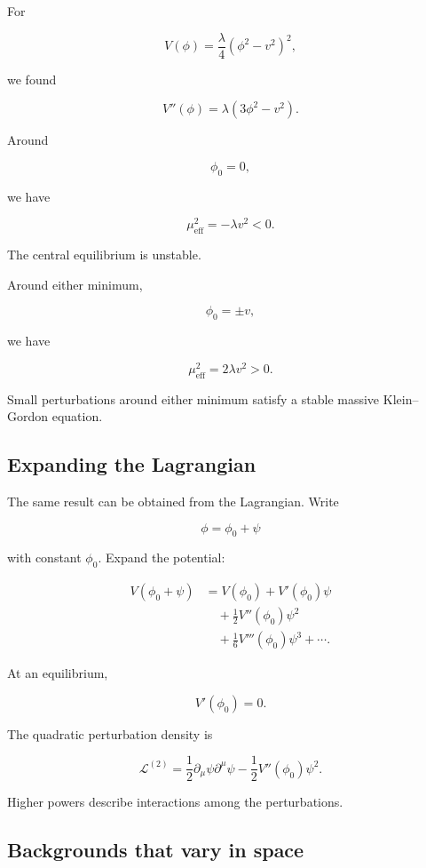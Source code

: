 For

\[
V(\phi)
=
\frac{\lambda}{4}
(\phi^{2}-v^{2})^{2},
\]

we found

\[
V''(\phi)
=
\lambda(3\phi^{2}-v^{2}).
\]

Around

\[
\phi_{0}=0,
\]

we have

\[
\boxed{
\mu_{\mathrm{eff}}^{2}
=
-\lambda v^{2}<0
}.
\]

The central equilibrium is unstable.

Around either minimum,

\[
\phi_{0}=\pm v,
\]

we have

\[
\boxed{
\mu_{\mathrm{eff}}^{2}
=
2\lambda v^{2}>0
}.
\]

Small perturbations around either minimum satisfy a stable massive Klein--Gordon equation.

\subsection{Expanding the Lagrangian}

The same result can be obtained from the Lagrangian. Write

\[
\phi=\phi_{0}+\psi
\]

with constant \(\phi_{0}\). Expand the potential:

\[
\begin{aligned}
V(\phi_{0}+\psi)
&=
V(\phi_{0})
+
V'(\phi_{0})\psi\\
&\quad+
\frac{1}{2}
V''(\phi_{0})\psi^{2}\\
&\quad+
\frac{1}{6}
V'''(\phi_{0})\psi^{3}
+
\cdots.
\end{aligned}
\]

At an equilibrium,

\[
V'(\phi_{0})=0.
\]

The quadratic perturbation density is

\[
\boxed{
\mathcal{L}^{(2)}
=
\frac{1}{2}
\partial_{\mu}\psi
\partial^{\mu}\psi
-
\frac{1}{2}
V''(\phi_{0})\psi^{2}
}.
\]

Higher powers describe interactions among the perturbations.

\subsection{Backgrounds that vary in space}

